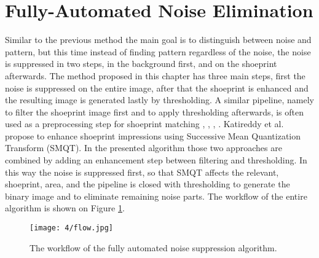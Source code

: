 \documentclass[draft,final]{vutinfth} %
\begin{document}
\section{Fully-Automated Noise Elimination}

\par
Similar to the previous method the main goal is to distinguish between noise and pattern, but this time instead of finding pattern regardless of the noise, the noise is suppressed in two steps, in the background first, and on the shoeprint afterwards.
The method proposed in this chapter has three main steps, first the noise is suppressed on the entire image, after that the shoeprint is enhanced and the resulting image is generated lastly by thresholding.
A similar pipeline, namely to filter the shoeprint image first and to apply thresholding afterwards, is  often used as a preprocessing step for shoeprint matching \cite{alizadeh2017automatic}, \cite{wang2014automatic}, \cite{li2014retrieval}, \cite{kong2014novel}.
Katireddy et al. \cite{katireddy2017novel} propose to enhance shoeprint impressions using Successive Mean Quantization Transform (SMQT).
In the presented algorithm those two approaches are combined by adding an enhancement step between filtering and thresholding.
In this way the noise is suppressed first, so that SMQT affects the relevant, shoeprint, area, and the pipeline is closed with thresholding to generate the binary image and to eliminate remaining noise parts.
The workflow of the entire algorithm is shown on Figure \ref{fig:fans:workflow}.

\begin{figure}[h]
  \centering
  \texttt{[image: 4/flow.jpg]}
  \caption{The workflow of the fully automated noise suppression algorithm.}
  \label{fig:fans:workflow} %
\end{figure}
\end{document}
